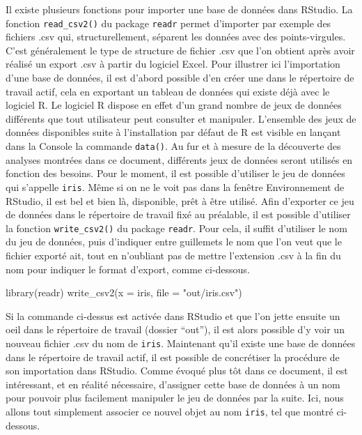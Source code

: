 \documentclass[
]{book}
\newenvironment{Shaded}{\begin{snugshade}}{\end{snugshade}}
\newcommand{\AttributeTok}[1]{\textcolor[rgb]{0.77,0.63,0.00}{#1}}
\newcommand{\FunctionTok}[1]{\textcolor[rgb]{0.00,0.00,0.00}{#1}}
\newcommand{\NormalTok}[1]{#1}
\newcommand{\StringTok}[1]{\textcolor[rgb]{0.31,0.60,0.02}{#1}}
\begin{document}
Il existe plusieurs fonctions pour importer une base de données dans RStudio. La fonction \texttt{read\_csv2()} du package \texttt{readr} permet d'importer par exemple des fichiers .csv qui, structurellement, séparent les données avec des points-virgules. C'est généralement le type de structure de fichier .csv que l'on obtient après avoir réalisé un export .csv à partir du logiciel Excel. Pour illustrer ici l'importation d'une base de données, il est d'abord possible d'en créer une dans le répertoire de travail actif, cela en exportant un tableau de données qui existe déjà avec le logiciel R. Le logiciel R dispose en effet d'un grand nombre de jeux de données différents que tout utilisateur peut consulter et manipuler. L'ensemble des jeux de données disponibles suite à l'installation par défaut de R est visible en lançant dans la Console la commande \texttt{data()}. Au fur et à mesure de la découverte des analyses montrées dans ce document, différents jeux de données seront utilisés en fonction des besoins. Pour le moment, il est possible d'utiliser le jeu de données qui s'appelle \texttt{iris}. Même si on ne le voit pas dans la fenêtre Environnement de RStudio, il est bel et bien là, disponible, prêt à être utilisé. Afin d'exporter ce jeu de données dans le répertoire de travail fixé au préalable, il est possible d'utiliser la fonction \texttt{write\_csv2()} du package \texttt{readr}. Pour cela, il suffit d'utiliser le nom du jeu de données, puis d'indiquer entre guillemets le nom que l'on veut que le fichier exporté ait, tout en n'oubliant pas de mettre l'extension .csv à la fin du nom pour indiquer le format d'export, comme ci-dessous.

\begin{Shaded}
\begin{Highlighting}[]
\FunctionTok{library}\NormalTok{(readr)}
\FunctionTok{write\_csv2}\NormalTok{(}\AttributeTok{x =}\NormalTok{ iris, }\AttributeTok{file =} \StringTok{"out/iris.csv"}\NormalTok{)}
\end{Highlighting}
\end{Shaded}

Si la commande ci-dessus est activée dans RStudio et que l'on jette ensuite un oeil dans le répertoire de travail (dossier ``out''), il est alors possible d'y voir un nouveau fichier .csv du nom de \texttt{iris}. Maintenant qu'il existe une base de données dans le répertoire de travail actif, il est possible de concrétiser la procédure de son importation dans RStudio. Comme évoqué plus tôt dans ce document, il est intéressant, et en réalité nécessaire, d'assigner cette base de données à un nom pour pouvoir plus facilement manipuler le jeu de données par la suite. Ici, nous allons tout simplement associer ce nouvel objet au nom \texttt{iris}, tel que montré ci-dessous.
\end{document}
